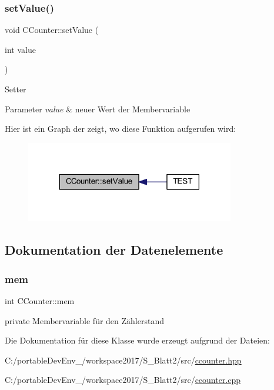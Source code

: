 \subsubsection{\texorpdfstring{set\+Value()}{setValue()}}
{\footnotesize\ttfamily void C\+Counter\+::set\+Value (\begin{DoxyParamCaption}\item[{int}]{value }\end{DoxyParamCaption})}

Setter 
\begin{DoxyParams}{Parameter}
{\em value} & neuer Wert der Membervariable \\
\hline
\end{DoxyParams}
Hier ist ein Graph der zeigt, wo diese Funktion aufgerufen wird\+:\nopagebreak
\begin{figure}[H]
\begin{center}
\leavevmode
\includegraphics[width=258pt]{class_c_counter_ac41245afdd95c0149e99bad21696a372_icgraph}
\end{center}
\end{figure}


\subsection{Dokumentation der Datenelemente}
\mbox{\label{class_c_counter_a69073a439ebaa1c748607fdf0eb8d841}} 
\subsubsection{\texorpdfstring{mem}{mem}}
{\footnotesize\ttfamily int C\+Counter\+::mem\hspace{0.3cm}{\ttfamily [protected]}}



private Membervariable für den Zählerstand 



Die Dokumentation für diese Klasse wurde erzeugt aufgrund der Dateien\+:\begin{DoxyCompactItemize}
\item 
C\+:/portable\+Dev\+Env\+\_/workspace2017/\+S\+\_\+\+Blatt2/src/\hyperlink{ccounter_8hpp}{ccounter.\+hpp}\item 
C\+:/portable\+Dev\+Env\+\_/workspace2017/\+S\+\_\+\+Blatt2/src/\hyperlink{ccounter_8cpp}{ccounter.\+cpp}\end{DoxyCompactItemize}
